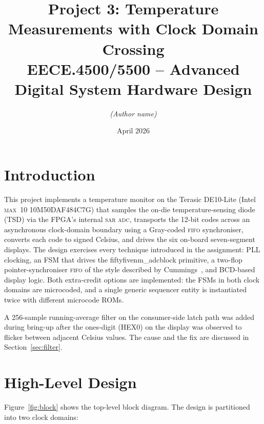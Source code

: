 \documentclass[12pt,letterpaper]{article}
\title{\textbf{Project 3: Temperature Measurements with Clock Domain Crossing}\\
  \large EECE.4500/5500 -- Advanced Digital System Hardware Design}
\author{\textit{(Author name)}}
\date{April 2026}
\begin{document}
\maketitle

\section{Introduction}

This project implements a temperature monitor on the Terasic DE10-Lite
(Intel \textsc{max~10} 10M50DAF484C7G) that samples the on-die temperature-sensing
diode (TSD) via the FPGA's internal \textsc{sar} \textsc{adc}, transports the 12-bit
codes across an asynchronous clock-domain boundary using a Gray-coded
\textsc{fifo} synchroniser, converts each code to signed Celsius, and drives the
six on-board seven-segment displays.  The design exercises every technique
introduced in the assignment: PLL clocking, an FSM that drives the
\textsf{fiftyfivenm\_adcblock} primitive, a two-flop pointer-synchroniser
\textsc{fifo} of the style described by Cummings~\cite{cummings}, and BCD-based
display logic.  Both extra-credit options are implemented: the FSMs in both
clock domains are microcoded, and a single generic sequencer entity is
instantiated twice with different microcode ROMs.

A 256-sample running-average filter on the consumer-side latch path was added
during bring-up after the ones-digit (HEX0) on the display was observed to
flicker between adjacent Celsius values.  The cause and the fix are discussed
in Section~\ref{sec:filter}.

\section{High-Level Design}
\label{sec:overview}

Figure~\ref{fig:block} shows the top-level block diagram.  The design is
partitioned into two clock domains:
\end{document}
